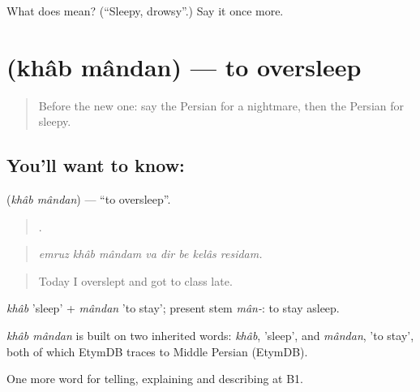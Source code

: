 \begin{tcolorbox}[breakable,colback=teal!4,colframe=teal!35!black,title={Before you move on}]
What does  mean? (\textquotedblleft{}Sleepy, drowsy\textquotedblright{}.) Say it once more.
\end{tcolorbox}
\section[\texorpdfstring{\fa{خواب} \fa{ماندن} (khâb mândan)}{خواب ماندن (khâb mândan)}]{  (khâb mândan) — to oversleep}

\label{lesson:FA-C499-khab-mandan}



\begin{quote}
Before the new one: say the Persian for a nightmare, then the Persian for sleepy.
\end{quote}

\subsection*{You'll want to know:  }
\textbf{ } (\emph{khâb mândan}) — \textquotedblleft{}to oversleep\textquotedblright{}.

\begin{quote}
       .
\end{quote}

\begin{quote}
\emph{emruz khâb mândam va dir be kelâs residam.}
\end{quote}

\begin{quote}
Today I overslept and got to class late.
\end{quote}

\emph{khâb} 'sleep' + \emph{mândan} 'to stay'; present stem \emph{mân-}: to stay asleep.

\begin{cousinweb}
\emph{khâb mândan} is built on two inherited words: \emph{khâb}, 'sleep', and \emph{mândan}, 'to stay', both of which EtymDB traces to Middle Persian (EtymDB).
\end{cousinweb}

\begin{grammarlens}[title={What you've built}]
One more word for telling, explaining and describing at B1.
\end{grammarlens}


